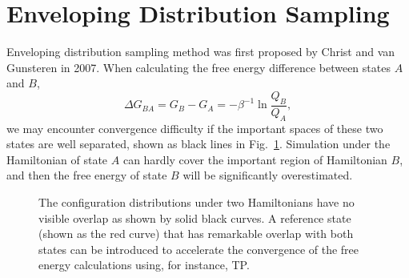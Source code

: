 \section{Enveloping Distribution Sampling\label{Sec:ES:EDS}}
Enveloping distribution sampling method was first proposed by Christ and van Gunsteren in 2007.\cite{ChristJCP2007}
When calculating the free energy difference between states $A$ and $B$,
\begin{equation}
	\Delta G_{BA}=G_B-G_A=-\beta^{-1}\ln{\frac{Q_B}{Q_A}},
\end{equation}
we may encounter convergence difficulty if the important spaces of these two states are well separated, shown as black lines in Fig.~\ref{Fig:ES:triple_gaussian}.
Simulation under the Hamiltonian of state $A$ can hardly cover the important region of Hamiltonian $B$, and then the free energy of state $B$ will be significantly overestimated.
\begin{figure}[htbp]
	\centering
	\caption{The configuration distributions under two Hamiltonians have no visible overlap as shown by solid black curves. A reference state (shown as the red curve) that has remarkable overlap with both states can be introduced to accelerate the convergence of the free energy calculations using, for instance, TP.}\label{Fig:ES:triple_gaussian}
\end{figure}

